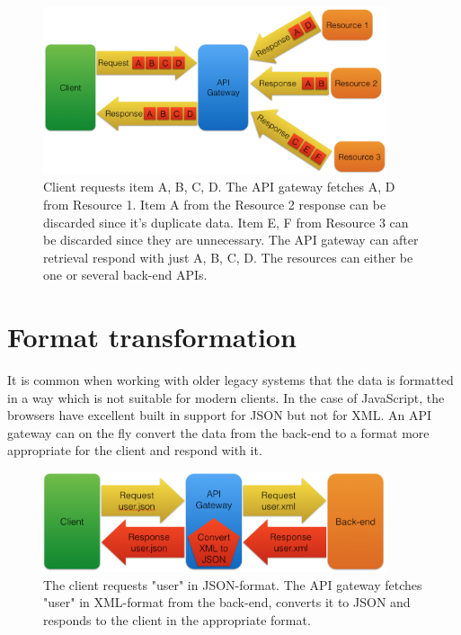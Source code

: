 \documentclass{cslthse-msc}
\begin{document}
\begin{figure}[H]
  \centering
    \begin{center}
      \includegraphics[width=0.9\textwidth]{images/api_gateway_duplicate.png}
    \end{center}
  \caption{Client requests item A, B, C, D. The API gateway fetches A, D from Resource 1. Item A from the Resource 2 response can be discarded since it's duplicate data. Item E, F from Resource 3 can be discarded since they are unnecessary. The API gateway can after retrieval respond with just A, B, C, D. The resources can either be one or several back-end APIs.}
\end{figure}

\section{Format transformation}
It is common when working with older legacy systems that the data is formatted in a way which is not suitable for modern clients. In the case of JavaScript, the browsers have excellent built in support for JSON but not for XML. An API gateway can on the fly convert the data from the back-end to a format more appropriate for the client and respond with it.

\begin{figure}[H]
  \centering
    \begin{center}
      \includegraphics[width=0.9\textwidth]{images/api_gateway_transform.png}
    \end{center}
  \caption{The client requests "user" in JSON-format. The API gateway fetches "user" in XML-format from the back-end, converts it to JSON and responds to the client in the appropriate format.}
\end{figure}
\end{document}
